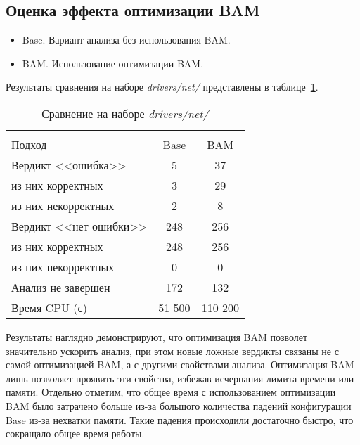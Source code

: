 \subsection{Оценка эффекта оптимизации BAM}

\begin{itemize}
\item Base. Вариант анализа без использования BAM.
\item BAM. Использование оптимизации BAM.
\end{itemize}

Результаты сравнения на наборе \textit{drivers/net/} представлены в таблице~\ref{table-drivers-bam}.

  \begin{table}[h]\footnotesize \centering
    \caption{Сравнение на наборе \textit{drivers/net/}}
  	\label{table-drivers-bam}
    \begin{tabular}{ | l | c | c | }
      \hline
      		& 		\multicolumn{2}{c|}{\combatmode}  \\
      Подход         				& Base  	& BAM 	\\ \hline
      Вердикт <<ошибка>> 				& 5   		& 37    \\ 
  \hspace{0.5cm} из них корректных 	& 3 		& 29 	\\ 
  \hspace{0.5cm} из них некорректных & 2		& 8 	\\ \hline
      Вердикт <<нет ошибки>>  		& 248    	& 256    \\ 
  \hspace{0.5cm} из них корректных 	& 248 		& 256    \\
  \hspace{0.5cm} из них некорректных & 0 		& 0    	\\ \hline
      Анализ не завершен       		& 172    	& 132    \\ \hline
      Время CPU (с)   				& 51 500 	& 110 200 \\ 
      \hline
    \end{tabular}
  \end{table}

Результаты наглядно демонстрируют, что оптимизация BAM позволет значительно ускорить анализ, при этом новые ложные вердикты связаны не с самой оптимизацией BAM, а с другими свойствами анализа.
Оптимизация BAM лишь позволяет проявить эти свойства, избежав исчерпания лимита времени или памяти.
Отдельно отметим, что общее время с использованием оптимизации BAM было затрачено больше из-за большого количества падений конфигурации Base из-за нехватки памяти. 
Такие падения происходили достаточно быстро, что сокращало общее время работы.

